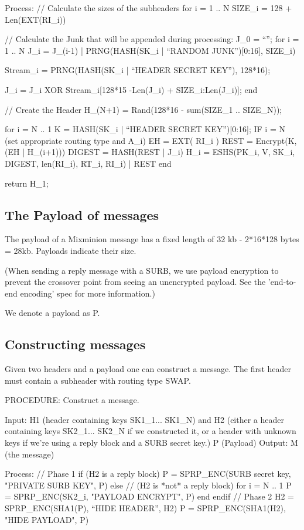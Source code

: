 Process: 
  // Calculate the sizes of the subheaders
  for i = 1 .. N
	SIZE_i = 128 + Len(EXT(RI_i))

  // Calculate the Junk that will be appended during processing:
  J_0 = ``'';
  for i = 1 .. N
	J_i = J_(i-1) | PRNG(HASH(SK_i | ``RANDOM JUNK'')[0:16], SIZE_i)

        Stream_i = PRNG(HASH(SK_i | ``HEADER SECRET KEY''), 128*16);

	J_i = J_i XOR Stream_i[128*15 -Len(J_i) + SIZE_i:Len(J_i)];
  end

  // Create the Header
  H_(N+1) = Rand(128*16 - sum(SIZE_1 .. SIZE_N));

  for i = N .. 1
	K = HASH(SK_i | ``HEADER SECRET KEY'')[0:16];
	IF i = N (set appropriate routing type and A_i)
	EH = EXT( RI_i )
        REST = Encrypt(K, (EH | H_(i+1)))
  	DIGEST = HASH(REST | J_i)
	H_i = ESHS(PK_i, V, SK_i, DIGEST, len(RI_i), RT_i, RI_i) | REST
  end

return H_1;

\subsection{The Payload of messages}

The payload of a Mixminion message has a fixed length of 32 kb
- 2*16*128 bytes = 28kb.   Payloads indicate their size.

(When sending a reply message with a SURB, we use payload encryption
to prevent the crossover point from seeing an unencrypted payload. See
the 'end-to-end encoding' spec for more information.)

We denote a payload as P.

\subsection{Constructing messages}

Given two headers and a payload one can construct a
message. The first header must contain a subheader
with routing type SWAP.  

PROCEDURE: Construct a message.

Input: H1 (header containing keys SK1_1... SK1_N)
       and H2 (either a header containing keys SK2_1... SK2_N if
         we constructed it, or a header with unknown keys if we're
         using a reply block and a SURB secret key.)
       P (Payload)
Output: M (the message)

Process:
        // Phase 1
        if (H2 is a reply block)
                P = SPRP_ENC(SURB secret key, "PRIVATE SURB KEY", P)
	else // (H2 is *not* a reply block)
		for i = N .. 1
	            P = SPRP_ENC(SK2_i, "PAYLOAD ENCRYPT", P)
		end
        endif
	// Phase 2
	H2 = SPRP_ENC(SHA1(P), ``HIDE HEADER'', H2)
        P = SPRP_ENC(SHA1(H2), "HIDE PAYLOAD", P)

